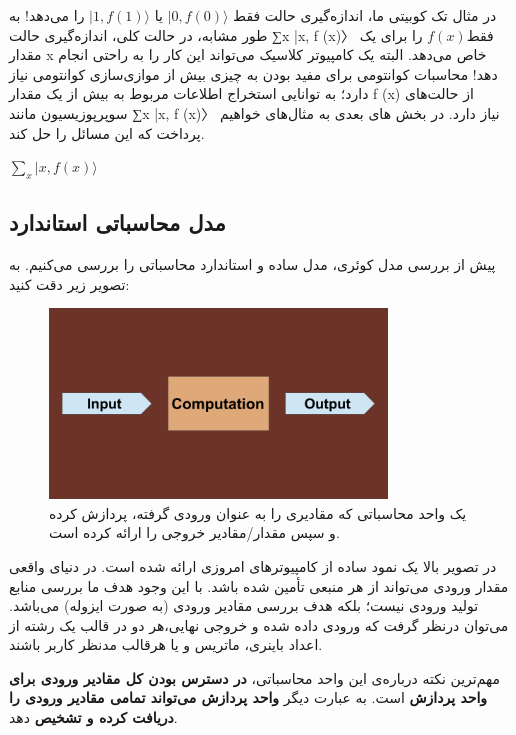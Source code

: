 \documentclass{book}
\begin{document}
در مثال تک کوبیتی ما، اندازه‌گیری حالت فقط $\vert 0, f(0)\rangle$ یا $\vert 1, f(1)\rangle$ را می‌دهد! به طور مشابه، در حالت کلی، اندازه‌گیری حالت ∑x |x, f (x)〉 فقط$ f (x)$ را برای یک مقدار x خاص می‌دهد. البته یک کامپیوتر کلاسیک می‌تواند این کار را به راحتی انجام دهد! محاسبات کوانتومی برای مفید بودن به چیزی بیش از موازی‌سازی کوانتومی نیاز دارد؛ به توانایی استخراج اطلاعات مربوط به بیش از یک مقدار f (x) از حالت‌های سوپرپوزیسیون مانند ∑x |x, f (x)〉 نیاز دارد. 
در بخش های بعدی به مثال‌های خواهیم پرداخت که این مسائل را حل کند.



$\sum_{x} \vert x, f(x)\rangle$

\newpage
\subsection{مدل محاسباتی استاندارد}
پیش از بررسی مدل کوئری،‌ مدل ساده و استاندارد محاسباتی را بررسی می‌کنیم. به تصویر زیر دقت کنید:

\begin{figure}[ht]
	\centering
	\includegraphics[width=0.8\textwidth]{standard computation model.png}
	\caption{یک واحد محاسباتی که مقادیری را به عنوان ورودی گرفته، پردازش کرده و سپس مقدار/مقادیر خروجی را ارائه کرده است.}
\end{figure}


در تصویر بالا یک نمود ساده از کامپیوتر‌های امروزی ارائه شده است. در دنیای واقعی مقدار ورودی می‌تواند از هر منبعی‌ تأمین شده باشد. با این وجود هدف ما بررسی منابع تولید ورودی نیست؛‌ بلکه هدف بررسی مقادیر ورودی (به صورت ایزوله) می‌باشد. می‌توان درنظر گرفت که ورودی داده شده و خروجی نهایی،‌هر دو در قالب یک رشته از اعداد باینری، ماتریس و یا هرقالب مدنظر کاربر باشند.

مهم‌ترین نکته درباره‌ی این واحد محاسباتی،‌ \textbf{در دسترس بودن کل مقادیر ورودی برای واحد پردازش} است. به عبارت دیگر\textbf{ واحد پردازش می‌تواند تمامی مقادیر ورودی را دریافت کرده و تشخیص} دهد. 
\end{document}
